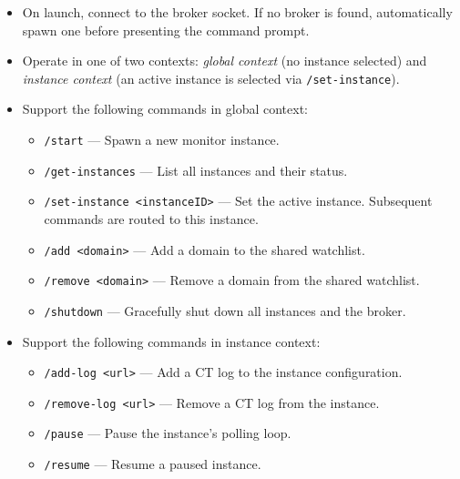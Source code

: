 \documentclass{article}
\begin{document}
\begin{itemize}

\item On launch, connect to the broker socket. If no broker is found, 
automatically spawn one before presenting the command prompt.

\item Operate in one of two contexts: \textit{global context} (no instance 
selected) and \textit{instance context} (an active instance is selected via 
\texttt{/set-instance}).

\item Support the following commands in global context:

\begin{itemize}

\item \texttt{/start} --- Spawn a new monitor instance.

\item \texttt{/get-instances} --- List all instances and their status.

\item \texttt{/set-instance <instanceID>} --- Set the active instance. 
Subsequent commands are routed to this instance.

\item \texttt{/add <domain>} --- Add a domain to the shared watchlist.

\item \texttt{/remove <domain>} --- Remove a domain from the shared watchlist.

\item \texttt{/shutdown} --- Gracefully shut down all instances and the broker.

\end{itemize}

\item Support the following commands in instance context:

\begin{itemize}

\item \texttt{/add-log <url>} --- Add a CT log to the instance configuration.

\item \texttt{/remove-log <url>} --- Remove a CT log from the instance.

\item \texttt{/pause} --- Pause the instance's polling loop.

\item \texttt{/resume} --- Resume a paused instance.


\end{itemize}
\end{itemize}
\end{document}

